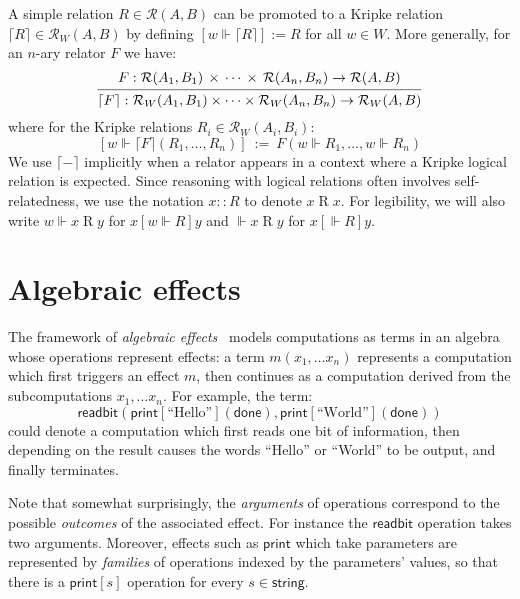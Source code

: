 \documentclass[draft,11pt]{report}
\theoremstyle{definition}
\newcommand{\kw}[1]{\ensuremath{ \mathsf{#1} }}
\newcommand{\ifr}[1]{\mathrel{[{#1}]}}
\begin{document}
A simple relation $R \in \mathcal{R}(A, B)$
can be promoted to a Kripke relation
$\lceil R \rceil \in \mathcal{R}_W(A, B)$
by defining $[w \Vdash \lceil R \rceil] := R$ for all $w \in W$.
More generally, for an $n$-ary relator $F$ we have:
\[
  \begin{prooftree}
  \hypo{
    F :
      \mathcal{R}(A_1, B_1) \,\times\,\cdots\,\times\,\mathcal{R}(A_n, B_n)
      \rightarrow \mathcal{R}(A, B)}
  \infer1{
    \lceil F \rceil :
      \mathcal{R}_W(A_1, B_1) \times \cdots \times \mathcal{R}_W(A_n, B_n)
      \rightarrow \mathcal{R}_W(A, B)}
  \end{prooftree}
\]
where for the Kripke relations $R_i \in \mathcal{R}_W(A_i, B_i)$:
\[
  [w \Vdash \lceil F \rceil (R_1, \ldots, R_n)] \: := \:
    F(w \Vdash R_1, \ldots, w \Vdash R_n)
\]
We use $\lceil - \rceil$ implicitly
when a relator appears in a context where
a Kripke logical relation is expected.
Since reasoning with logical relations
often involves self-relatedness,
we use the notation
$x :: R$ to denote $x \mathrel{R} x$.
For legibility, we will also write
$w \Vdash x \mathrel{R} y$ for $x \ifr{w \Vdash R} y$
and $\Vdash x \mathrel{R} y$ for $x \ifr{\Vdash R} y$.


\section{Algebraic effects} \label{sec:eff} %


The framework of \emph{algebraic effects}~\citep{effadq}
models computations as terms in an algebra
whose operations represent effects:
a term $m(x_1, \ldots x_n)$
represents a computation which first
triggers an effect $m$,
then continues as a computation derived from
the subcomputations $x_1, \ldots x_n$.
For example,
the term:
\[
    \kw{readbit}(
      \kw{print}[\text{``Hello''}](\kw{done}),
      \kw{print}[\text{``World''}](\kw{done}))
\]
could denote a computation which
first reads one bit of information,
then depending on the result
causes the words ``Hello'' or ``World'' to be output,
and finally terminates.

Note that somewhat surprisingly,
the \emph{arguments} of operations correspond to
the possible \emph{outcomes} of the associated effect.
For instance the $\kw{readbit}$ operation takes two arguments.
Moreover,
effects such as $\kw{print}$
which take parameters
are represented by \emph{families}
of operations indexed by the parameters' values,
so that there is a $\kw{print}[s]$
operation for every $s \in \kw{string}$.
\end{document}
